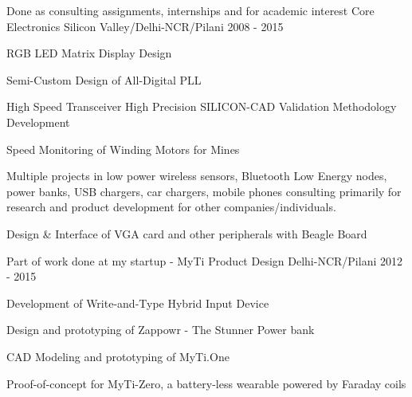 

\begin{cventries}

  \cventry
    {Done as consulting assignments, internships and for academic interest} %
    {Core Electronics} %
    {Silicon Valley/Delhi-NCR/Pilani} %
    {2008 - 2015} %
    {
      \begin{cvitems} %
        \item {RGB LED Matrix Display Design}
        \item {Semi-Custom Design of All-Digital PLL}
        \item {High Speed Transceiver High Precision SILICON-CAD Validation Methodology Development}
        \item {Speed Monitoring of Winding Motors for Mines}
        \item {Multiple projects in low power wireless sensors, Bluetooth Low Energy nodes, power banks, USB chargers, car chargers, mobile phones consulting primarily for research and product development for other companies/individuals.}
        \item {Design \& Interface of VGA card and other peripherals with Beagle Board}
      \end{cvitems}
    }

  \cventry
    {Part of work done at my startup - MyTi} %
    {Product Design} %
    {Delhi-NCR/Pilani} %
    {2012 - 2015} %
    {
      \begin{cvitems} %
        \item {Development of Write-and-Type Hybrid Input Device}
        \item {Design and prototyping of Zappowr - The Stunner Power bank}
        \item {CAD Modeling and prototyping of MyTi.One}
        \item {Proof-of-concept for MyTi-Zero, a battery-less wearable powered by Faraday coils}
      \end{cvitems}
    }


\end{cventries}
